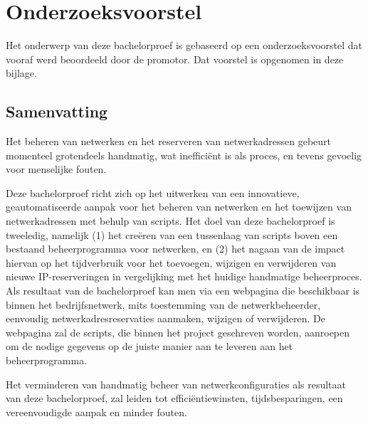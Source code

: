 \documentclass[dutch,dit,thesis]{hogentreport}
\begin{document}






%
%
%

%
%




\appendix
\chapter{Onderzoeksvoorstel}

Het onderwerp van deze bachelorproef is gebaseerd op een onderzoeksvoorstel dat vooraf werd beoordeeld door de promotor. Dat voorstel is opgenomen in deze bijlage.

\section*{Samenvatting}
Het beheren van netwerken en het reserveren van netwerkadressen gebeurt momenteel grotendeels handmatig, wat inefficiënt is als proces, en tevens gevoelig voor menselijke fouten. 

Deze bachelorproef richt zich op het uitwerken van een innovatieve, geautomatiseerde aanpak voor het beheren van netwerken en het
toewijzen van netwerkadressen met behulp van scripts. 
Het doel van deze bachelorproef is tweeledig, namelijk (1) het creëren van een tussenlaag van scripts boven een bestaand beheerprogramma voor netwerken, en (2) het nagaan van de impact hiervan op het tijdverbruik voor het toevoegen, wijzigen en verwijderen van nieuwe IP-reserveringen in vergelijking met het huidige handmatige beheerproces. Als resultaat van de bachelorproef kan men via een webpagina die beschikbaar is binnen het bedrijfsnetwerk, mits toestemming van de netwerkbeheerder, eenvoudig netwerkadresreservaties aanmaken, wijzigen of verwijderen.
De webpagina zal de scripts, die binnen het project geschreven worden, aanroepen om de nodige gegevens op de juiste manier aan te leveren aan het beheerprogramma. 

Het verminderen van handmatig beheer van netwerkconfiguraties als resultaat van deze bachelorproef, zal leiden tot efficiëntiewinsten, tijdsbesparingen, een vereenvoudigde aanpak en minder fouten.
\end{document}
